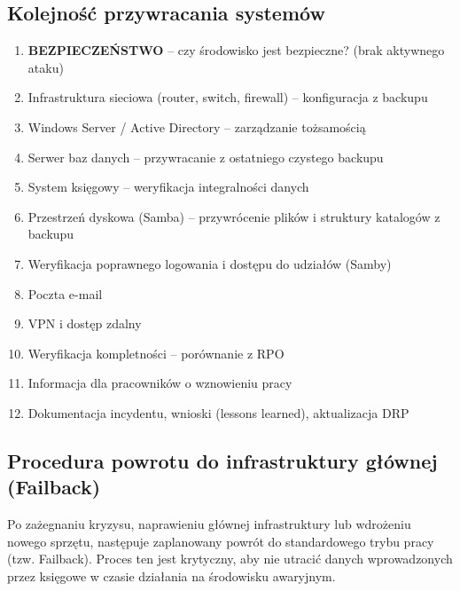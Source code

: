 \documentclass[12pt,a4paper]{article}
\providecommand{\tightlist}{\setlength{\itemsep}{0pt}\setlength{\parskip}{0pt}}
\begin{document}
\subsection{Kolejność przywracania
systemów}\label{kolejnoux15bux107-przywracania-systemuxf3w}

\begin{enumerate}
\tightlist
\item
  \textbf{BEZPIECZEŃSTWO} -- czy środowisko jest bezpieczne? (brak
  aktywnego ataku)
\item
  Infrastruktura sieciowa (router, switch, firewall) -- konfiguracja z
  backupu
\item
  Windows Server / Active Directory -- zarządzanie tożsamością
\item
  Serwer baz danych -- przywracanie z ostatniego czystego backupu
\item
  System księgowy -- weryfikacja integralności danych
\item
  Przestrzeń dyskowa (Samba) -- przywrócenie plików i struktury katalogów z backupu
\item
  Weryfikacja poprawnego logowania i dostępu do udziałów (Samby)
\item
  Poczta e-mail
\item
  VPN i dostęp zdalny
\item
  Weryfikacja kompletności -- porównanie z RPO
\item
  Informacja dla pracowników o wznowieniu pracy
\item
  Dokumentacja incydentu, wnioski (lessons learned), aktualizacja DRP
\end{enumerate}

\subsection{Procedura powrotu do infrastruktury głównej (Failback)}\label{procedura-powrotu-failback}

Po zażegnaniu kryzysu, naprawieniu głównej infrastruktury lub wdrożeniu nowego sprzętu, następuje zaplanowany powrót do standardowego trybu pracy (tzw. Failback). Proces ten jest krytyczny, aby nie utracić danych wprowadzonych przez księgowe w czasie działania na środowisku awaryjnym.
\end{document}
